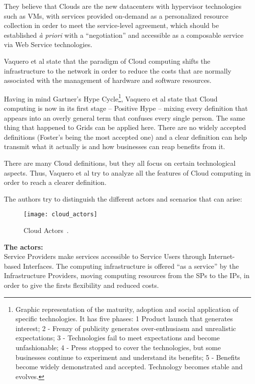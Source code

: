 They believe that Clouds are the new datacenters with hypervisor technologies such as VMs, with services provided on-demand as a personalized resource collection in order to meet the service-level agreement, which should be established \textit{à priori} with a ``negotiation'' and accessible as a composable service via Web Service technologies.


Vaquero et al state that the paradigm of Cloud computing shifts the infrastructure to the network in order to reduce the costs that are normally associated with the management of hardware and software resources.  

Having in mind Gartner’s Hype Cycle\footnote{Graphic representation of the maturity, adoption and social application of specific technologies. It has five phases: 1  Product launch that generates interest; 2 - Frenzy of publicity generates over-enthusiasm and unrealistic expectations; 3 - Technologies fail to meet expectations and become unfashionable; 4 - Press stopped to cover the technologies, but some businesses continue to experiment and understand its benefits; 5 - Benefits become widely demonstrated and accepted. Technology becomes stable and evolves.}, Vaquero et al state that Cloud computing is now in its first stage – Positive Hype – mixing every definition that appears into an overly general term that confuses every single person. The same thing that happened to Grids can be applied here. There are no widely accepted definitions (Foster’s being the most accepted one) and a clear definition can help transmit what it actually is and how businesses can reap benefits from it.

There are many Cloud definitions, but they all focus on certain technological aspects. Thus, Vaquero et al try to analyze all the features of Cloud computing in order to reach a clearer definition.

The authors try to distinguish the different actors and scenarios that can arise:

\begin{figure}[t]
  \begin{center}
    \leavevmode
    \texttt{[image: cloud\_actors]}
    \caption{Cloud Actors~\cite{Buyya2009599}.}
    \label{fig:cloud_actors}
  \end{center}
\end{figure}

\textbf{The actors:}\\
Service Providers make services accessible to Service Users through Internet-based Interfaces. The computing infrastructure is offered “as a service” by the Infrastructure Providers, moving computing resources from the SPs to the IPs, in order to give the firsts flexibility and reduced costs.

